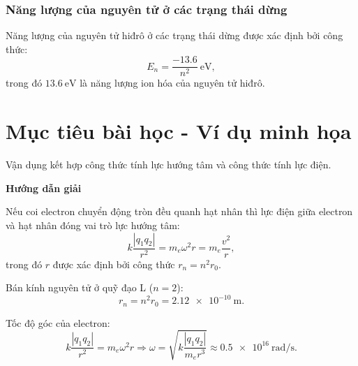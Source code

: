 \subsubsection{Năng lượng của nguyên tử ở các trạng thái dừng}
Năng lượng của nguyên tử hiđrô ở các trạng thái dừng được xác định bởi công thức:
\begin{equation}
	E_n= \dfrac {-13.6}{n ^2} \SI{}{\electronvolt},
\end{equation}
trong đó $\SI{13.6}{\electronvolt}$ là năng lượng ion hóa của nguyên tử hiđrô.

\section{Mục tiêu bài học - Ví dụ minh họa}
\begin{dang}{Vận dụng kết hợp công thức tính lực hướng tâm và công thức tính lực điện.}
{\begin{center}
	\textbf{Hướng dẫn giải}
\end{center}

	Nếu coi electron chuyển động tròn đều quanh hạt nhân thì lực điện giữa electron và hạt nhân đóng vai trò lực hướng tâm:
	\begin{equation*}
		k \dfrac {|q_1 q_2|}{r^2} = m_e \omega ^2 r = m_e \dfrac{v^2}{r},
	\end{equation*}
	trong đó $r$ được xác định bởi công thức $r_n = n^2 r_0$.

	Bán kính nguyên tử ở quỹ đạo L ($n = 2$):
	\begin{equation*}
		r_n =n^2 r_0 = \SI{2.12e-10}{\meter}.
	\end{equation*}
	
	Tốc độ góc của electron:
	\begin{equation*}
		k \dfrac {|q_1q_2|}{r^2} = m_e \omega ^2 r \Rightarrow \omega = \sqrt {k\dfrac{|q_1q_2|}{m_er^3}} \approx \SI{0.5e16}{\radian / \second}.
	\end{equation*}
	
}
\end{dang}
